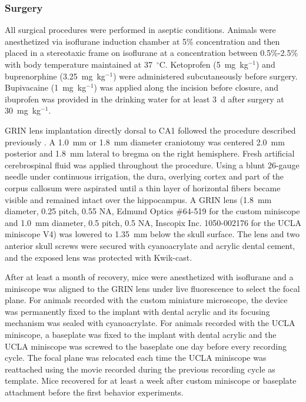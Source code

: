 \documentclass[fleqn,10pt]{wlscirep}
\begin{document}
\subsubsection*{Surgery}

All surgical procedures were performed in aseptic conditions. Animals were anesthetized via isoflurane induction chamber at 5\% concentration and then placed in a stereotaxic frame on isoflurane at a concentration between 0.5\%-2.5\% with body temperature maintained at 37~$^\circ$C. Ketoprofen (5~mg~kg$^{-1}$) and buprenorphine (3.25~mg~kg$^{-1}$) were administered subcutaneously before surgery. Bupivacaine (1~mg~kg$^{-1}$) was applied along the incision before closure, and ibuprofen was provided in the drinking water for at least 3~d after surgery at 30~mg~kg$^{-1}$.

GRIN lens implantation directly dorsal to CA1 followed the procedure described previously \cite{gonzalez_persistence_2019}. A 1.0~mm or 1.8~mm diameter craniotomy was centered 2.0~mm posterior and 1.8~mm lateral to bregma on the right hemisphere. Fresh artificial cerebrospinal fluid was applied throughout the procedure. Using a blunt 26-gauge needle under continuous irrigation, the dura, overlying cortex and part of the corpus callosum were aspirated until a thin layer of horizontal fibers became visible and remained intact over the hippocampus. A GRIN lens (1.8~mm diameter, 0.25 pitch, 0.55 NA, Edmund Optics \#64-519 for the custom miniscope and 1.0~mm diameter, 0.5 pitch, 0.5 NA, Inscopix Inc. 1050-002176 for the UCLA miniscope V4) was lowered to 1.35~mm below the skull surface. The lens and two anterior skull screws were secured with cyanoacrylate and acrylic dental cement, and the exposed lens was protected with Kwik-cast.

After at least a month of recovery, mice were anesthetized with isoflurane and a miniscope was aligned to the GRIN lens under live fluorescence to select the focal plane. For animals recorded with the custom miniature microscope, the device was permanently fixed to the implant with dental acrylic and its focusing mechanism was sealed with cyanoacrylate. For animals recorded with the UCLA miniscope, a baseplate was fixed to the implant with dental acrylic and the UCLA miniscope was screwed to the baseplate one day before every recording cycle. The focal plane was relocated each time the UCLA miniscope was reattached using the movie recorded during the previous recording cycle as template. Mice recovered for at least a week after custom miniscope or baseplate attachment before the first behavior experiments.
\end{document}
